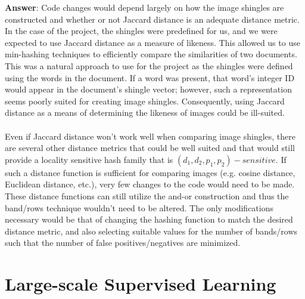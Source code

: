 \documentclass[11pt]{article}
\begin{document}
\begin{enumerate}
\textbf{Answer}: Code changes would depend largely on how the image shingles
are constructed and whether or not Jaccard distance is an adequate distance
metric. In the case of the project, the shingles were predefined for us, and we
were expected to use Jaccard distance as a measure of likeness.
This allowed us to use min-hashing techniques to efficiently compare the
similarities of two documents.  This was a natural approach to use for the
project as the shingles were defined using the words in the document.  If a
word was present, that word's integer ID would appear in the document's shingle
vector; however, such a representation seems poorly suited for creating image
shingles. Consequently, using Jaccard distance as a means of determining the
likeness of images could be ill-suited. \\ \\
Even if Jaccard distance won't work well when comparing image shingles, there
are several other distance metrics that could be well suited and that would
still provide a locality sensitive hash family that is 
$(d_1,d_2,p_1,p_2)-sensitive$. If such a distance function is sufficient for
comparing images (e.g. cosine distance, Euclidean distance, etc.), very few changes 
to the code would need to be made. These distance functions can still utilize 
the and-or construction and thus the band/rows technique wouldn't need to be
altered.  The only modifications necessary would be that of changing the hashing
function to match the desired distance metric, and also selecting suitable
values for the number of bands/rows such that the number of false
positives/negatives are minimized.


\end{enumerate}

\section{Large-scale Supervised Learning}
\end{document}
